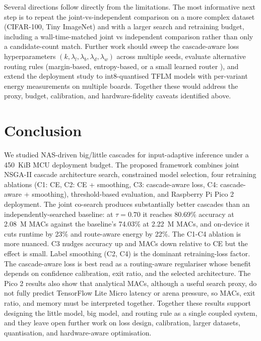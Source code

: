 \documentclass[conference]{IEEEtran}
\begin{document}
Several directions follow directly from the limitations. The most
informative next step is to repeat the joint-vs-independent comparison on
a more complex dataset (CIFAR-100, Tiny ImageNet) and with a larger
search and retraining budget, including a wall-time-matched joint vs
independent comparison rather than only a candidate-count match. Further
work should sweep the cascade-aware loss hyperparameters $(k, \lambda_l,
\lambda_b, \lambda_d, \lambda_w)$ across multiple seeds, evaluate
alternative routing rules (margin-based, entropy-based, or a small learned
router \cite{regol2024jeidnn,bolukbasi2017adaptive}), and extend the
deployment study to int8-quantised TFLM models with per-variant energy
measurements on multiple boards. Together these would address the proxy,
budget, calibration, and hardware-fidelity caveats identified above.

\section{Conclusion}
\label{sec:conclusion}

We studied NAS-driven big/little cascades for input-adaptive inference
under a 450~KiB MCU deployment budget. The proposed framework combines
joint NSGA-II cascade architecture search, constrained model selection,
four retraining ablations (C1: CE, C2: CE + smoothing, C3: cascade-aware
loss, C4: cascade-aware + smoothing), threshold-based evaluation, and
Raspberry Pi Pico 2 deployment. The joint co-search produces substantially
better cascades than an independently-searched baseline: at $\tau=0.70$ it
reaches 80.69\% accuracy at 2.08~M MACs against the baseline's 74.03\% at
2.22~M MACs, and on-device it cuts runtime by 23\% and route-aware energy
by 22\%. The C1-C4 ablation is more nuanced. C3 nudges accuracy up and
MACs down relative to CE but the effect is small. Label smoothing (C2, C4)
is the dominant retraining-loss factor. The cascade-aware loss is best
read as a routing-aware regulariser whose benefit depends on confidence
calibration, exit ratio, and the selected architecture. The Pico 2 results
also show that analytical MACs, although a useful search proxy, do not
fully predict TensorFlow Lite Micro latency or arena pressure, so MACs,
exit ratio, and memory must be interpreted together. Together these
results support designing the little model, big model, and routing rule as
a single coupled system, and they leave open further work on loss design,
calibration, larger datasets, quantisation, and hardware-aware
optimisation.
\end{document}
